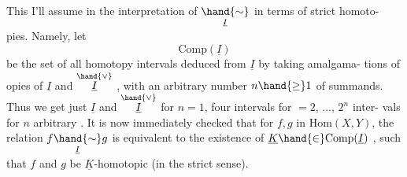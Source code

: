 This I'll assume in the interpretation of $\underset{\underline{I}}{\hand{\sim}}$ in terms of strict homoto-%
pies. Namely, let
\[ \mathrm{Comp}(\underline{I}) \]
be the set of all homotopy intervals deduced from $\underline{I}$ by taking amalgama-%
tions of opies of $\underline{I}$ and $\overset{\hand{\vee}}{\underline{I}}$ , with an arbitrary number $n \hand{\geq} 1$ of summands.
Thus we get just $\underline{I}$ and $\overset{\hand{\vee}}{\underline{I}}$ for $n=1$, four intervals for $=2$, ..., $2^n$ inter-%
vals for $n$ arbitrary . It is now immediately checked that for $f,g$ in
$\mathrm{Hom}(X,Y)$,  the relation $f \underset{\underline{I}}{\hand{\sim}} g$ is equivalent to the existence of
$\underline{K} \hand{\in} \mathrm{Comp}(\underline{I})$ , such that $f$ and $g$ be $\underline{K}$-homotopic (in the strict sense).

